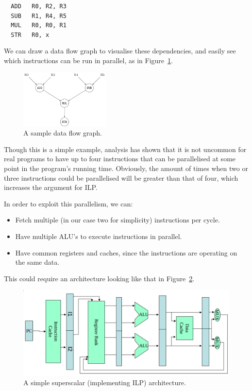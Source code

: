 \begin{verbatim}
  ADD   R0, R2, R3
  SUB   R1, R4, R5
  MUL   R0, R0, R1
  STR   R0, x
\end{verbatim}

We can draw a data flow graph to visualise these dependencies, and easily see
which instructions can be run in parallel, as in Figure~\ref{data-flow}.

\begin{figure}
  \centering
  \vspace{-2em}
  \includegraphics[width=0.4\textwidth]{diagrams/data-flow.pdf}
  \vspace{-2em}
  \caption{A sample data flow graph.}
  \vspace{-2em}
  \label{data-flow}
\end{figure}

Though this is a simple example, analysis has shown that it is not uncommon for
real programs to have up to four instructions that can be parallelised at some
point in the program's running time. Obviously, the amount of times when two or
three instructions could be parallelised will be greater than that of four,
which increases the argument for ILP.

In order to exploit this parallelism, we can:

\begin{itemize}
  \item Fetch multiple (in our case two for simplicity) instructions per cycle.
  \item Have multiple ALU's to execute instructions in parallel.
  \item Have common registers and caches, since the instructions are operating
  on the same data.
\end{itemize}

This could require an architecture looking like that in
Figure~\ref{superscalar}.

\begin{figure}[ht]
  \centering
  \includegraphics[width=\textwidth]{images/superscalar}
  \caption{A simple superscalar (implementing ILP) architecture.}
  \label{superscalar}
\end{figure}

